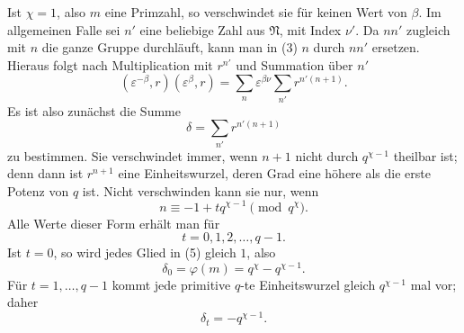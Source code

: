 \documentclass[11pt]{article}
\providecommand{\grpN}{\mathfrak N}
\begin{document}
Ist $\chi=1$, also $m$ eine Primzahl, so verschwindet sie für keinen Wert von $\beta$. Im allgemeinen Falle sei $n'$ eine beliebige Zahl aus $\grpN$, mit Index $\nu'$. Da $nn'$ zugleich mit $n$ die ganze Gruppe durchläuft, kann man in (3) $n$ durch $nn'$ ersetzen. Hieraus folgt nach Multiplication mit $r^{n'}$ und Summation über $n'$
\begin{equation}
 (\varepsilon^{-\beta},r)(\varepsilon^\beta,r)
 =\sum_n \varepsilon^{\beta\nu}
 \sum_{n'} r^{n'(n+1)}.
\tag{4}
\end{equation}
Es ist also zunächst die Summe
\begin{equation}
 \delta=\sum_{n'}r^{n'(n+1)}
\tag{5}
\end{equation}
zu bestimmen. Sie verschwindet immer, wenn $n+1$ nicht durch $q^{\chi-1}$ theilbar ist; denn dann ist $r^{n+1}$ eine Einheitswurzel, deren Grad eine höhere als die erste Potenz von $q$ ist. Nicht verschwinden kann sie nur, wenn
\begin{equation}
 n\equiv -1+tq^{\chi-1}\pmod {q^\chi}.
\tag{6}
\end{equation}
Alle Werte dieser Form erhält man für
\begin{equation}
 t=0,1,2,
\ldots,q-1.
\tag{7}
\end{equation}
Ist $t=0$, so wird jedes Glied in (5) gleich $1$, also
\begin{equation}
 \delta_0=\varphi(m)=q^\chi-q^{\chi-1}.
\tag{8}
\end{equation}
Für $t=1,
\ldots,q-1$ kommt jede primitive $q$-te Einheitswurzel gleich $q^{\chi-1}$ mal vor; daher
\begin{equation}
 \delta_t=-q^{\chi-1}.
\tag{9}
\end{equation}
\end{document}

